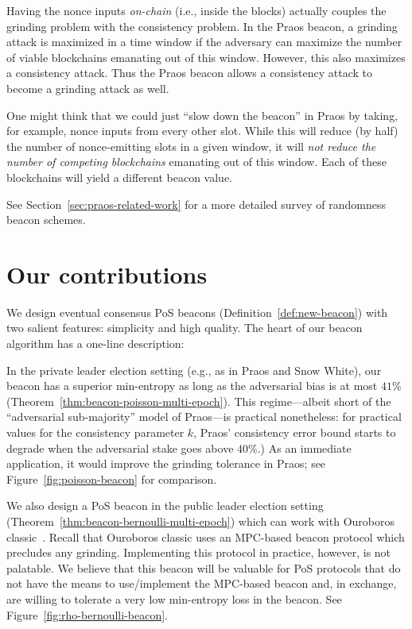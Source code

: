     Having the nonce inputs \emph{on-chain} (i.e., inside the blocks)
    actually couples the grinding problem with the consistency problem. 
    In the Praos beacon, a grinding attack is maximized in a time window 
    if the adversary can maximize the number of viable blockchains emanating out of this window. 
    However, this also maximizes a consistency attack. 
    Thus the Praos beacon allows a consistency attack to 
    become a grinding attack as well.

    One might think that we could just ``slow down the beacon'' in Praos 
    by taking, for example, nonce inputs from every other slot. 
    While this will reduce (by half) the number of nonce-emitting slots in a given window, 
    it will \emph{not reduce the number of competing blockchains} emanating out of this window. 
    Each of these blockchains will yield a different beacon value. 


    See Section~\ref{sec:praos-related-work} for 
    a more detailed survey of randomness beacon schemes.



\section{Our contributions}
    We design eventual consensus PoS beacons 
    (Definition~\ref{def:new-beacon}) 
    with two salient features: simplicity and high quality. 
    The heart of our beacon algorithm has a one-line description: 


    In the private leader election setting (e.g., as in Praos and Snow White), 
    our beacon has a superior min-entropy 
    as long as the adversarial bias is at most $41\%$ (Theorem~\ref{thm:beacon-poisson-multi-epoch}). 
    This regime---albeit short of the ``adversarial sub-majority'' model of Praos---is practical nonetheless: 
    for practical values for the consistency parameter $k$, 
    Praos' consistency error bound 
    starts to degrade when the adversarial stake goes above $40\%$.) 
    As an immediate application, it would improve the grinding tolerance in Praos; 
    see Figure~\ref{fig:poisson-beacon} for comparison.


    We also design a PoS beacon in the public leader election setting (Theorem~\ref{thm:beacon-bernoulli-multi-epoch})
    which can work with Ouroboros classic~\cite{Ouroboros}. 
    Recall that Ouroboros classic uses an MPC-based beacon protocol 
    which precludes any grinding. 
    Implementing this protocol in practice, however, is not palatable. 
    We believe that this beacon will be valuable for 
    PoS protocols 
    that do not have the means to use/implement the MPC-based beacon 
    and, in exchange, are willing to tolerate a very low min-entropy loss 
    in the beacon. 
    See Figure~\ref{fig:rho-bernoulli-beacon}.


